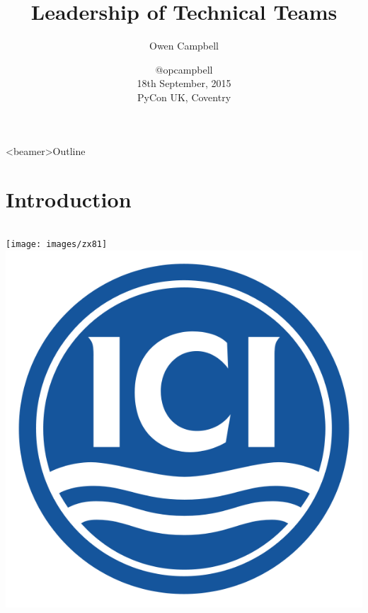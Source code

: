 \documentclass[14pt]{beamer}
\title{Leadership of Technical Teams}
\author{Owen Campbell}
\date[PyCon UK 2015]{
  @opcampbell\\
  \vspace{1cm}
  18th September, 2015\\
  PyCon UK, Coventry}
\begin{document}
\begin{frame}
  \titlepage{}
\end{frame}

{
  \begin{frame}<beamer>{Outline}
    \tableofcontents
  \end{frame}
}

  \section{Introduction}

    \blankscreen

    \begin{frame}{}
      \begin{columns}
          \texttt{[image: images/zx81]}
        \pause
          \includegraphics[scale=0.1]{images/ici}\\[2em]

\end{columns}
\end{frame}
\end{document}
